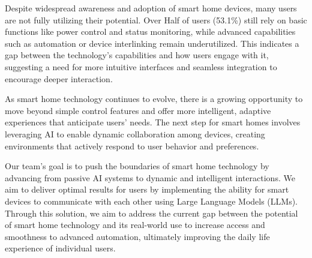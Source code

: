 \documentclass[conference]{IEEEtran}
\begin{document}
\begin{itemize}
    \hspace{1em} Despite widespread awareness and adoption of smart home devices, many users are not fully utilizing their potential. Over Half of users (53.1\%) still rely on basic functions like power control and status monitoring, while advanced capabilities such as automation or device interlinking remain underutilized. This indicates a gap between the technology's capabilities and how users engage with it, suggesting a need for more intuitive interfaces and seamless integration to encourage deeper interaction.
    
    \hspace{1em} As smart home technology continues to evolve, there is a growing opportunity to move beyond simple control features and offer more intelligent, adaptive experiences that anticipate users' needs. The next step for smart homes involves leveraging AI to enable dynamic collaboration among devices, creating environments that actively respond to user behavior and preferences.
    
    \hspace{1em} Our team's goal is to push the boundaries of smart home technology by advancing from passive AI systems to dynamic and intelligent interactions. We aim to deliver optimal results for users by implementing the ability for smart devices to communicate with each other using Large Language Models (LLMs). Through this solution, we aim to address the current gap between the potential of smart home technology and its real-world use to increase access and smoothness to advanced automation, ultimately improving the daily life experience of individual users.
\end{itemize}
\end{document}
